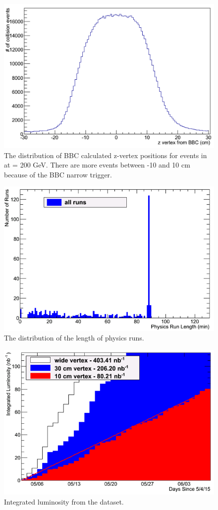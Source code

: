 \begin{figure}[h!]
\begin{center}
\includegraphics[width=0.65\linewidth]{figs/bbc_z_vertex_dist.png}
\caption{The distribution of BBC calculated z-vertex positions for events in \pau at \sqsn = 200 GeV. There are more events between -10 and 10 cm because of the BBC narrow trigger.}\label{fig:bbc_z_vtx_dist}

\end{center}
\end{figure}

\begin{figure}[!h]
\begin{center}
\includegraphics[width=0.65\linewidth]{figs/hruntime.png}
\caption{The distribution of the length of physics runs.}
\end{center}
\end{figure}

\begin{figure}[!h]
\begin{center}
\includegraphics[width=0.65\linewidth]{figs/integrated_luminosity.png}
\caption{Integrated luminosity from the \pau dataset.}
\end{center}
\end{figure}

